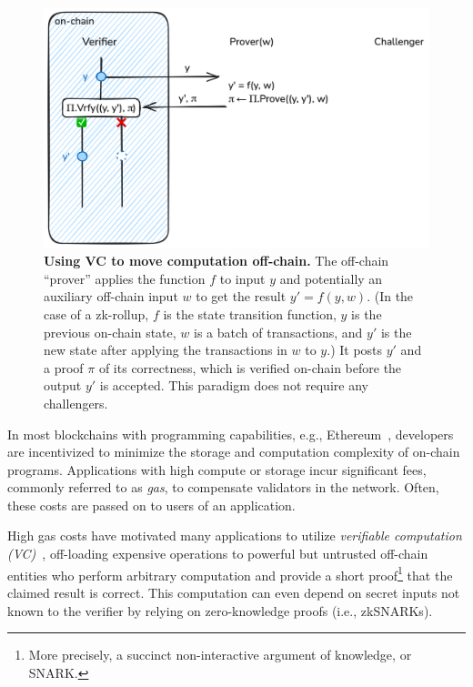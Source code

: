  \begin{figure}[tbh]
    \includegraphics[width=\textwidth]{naysayer/figs/vc.png}
    \caption{\textbf{Using VC to move computation off-chain.} The off-chain ``prover'' applies the function $f$ to input $y$ and potentially an auxiliary off-chain input $w$ to get the result $y' = f(y, w)$. (In the case of a zk-rollup, $f$ is the state transition function, $y$ is the previous on-chain state, $w$ is a batch of transactions, and $y'$ is the new state after applying the transactions in $w$ to $y$.) It posts $y'$ and a proof $\pi$ of its correctness, which is verified on-chain before the output $y'$ is accepted. This paradigm does not require any challengers.}
    \label{fig:vc}
 \end{figure}

In most blockchains with programming capabilities, e.g., Ethereum~\cite{ethereum_yellowpaper}, developers are incentivized to minimize the storage and computation complexity of on-chain programs. Applications with high compute or storage incur significant fees, commonly referred to as \emph{gas}, to compensate validators in the network. Often, these costs are passed on to users of an application. 

High gas costs have motivated many applications to utilize \emph{verifiable computation (VC)}~\cite{C:GenGenPar10}, off-loading expensive operations to powerful but untrusted off-chain entities who perform arbitrary computation and provide a short proof\footnote{More precisely, a succinct non-interactive argument of knowledge, or SNARK.} that the claimed result is correct.
This computation can even depend on secret inputs not known to the verifier by relying on zero-knowledge proofs (i.e., zkSNARKs).

